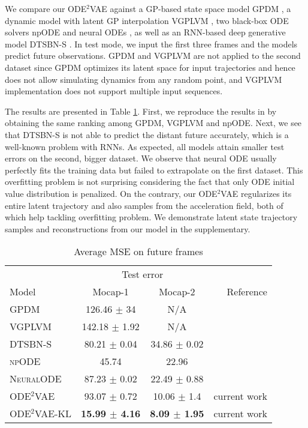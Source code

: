 \documentclass{article}
\newcommand{\0}{\mathbf{0}}
\begin{document}
We compare our ODE$^2$VAE against a GP-based state space model GPDM \citep{wang2008gaussian}, a dynamic model with latent GP interpolation VGPLVM \citep{damianou2011variational}, two black-box ODE solvers npODE \citep{heinonen18a} and neural ODEs \citep{chen2018neural}, as well as an RNN-based deep generative model DTSBN-S \citep{gan2015deep}. In test mode, we input the first three frames and the models predict future observations. GPDM and VGPLVM are not applied to the second dataset since GPDM optimizes its latent space for input trajectories and hence does not allow simulating dynamics from any random point, and VGPLVM implementation does not support multiple input sequences.

The results are presented in Table \ref{tab:cmu}. First, we reproduce the results in \citet{heinonen18a} by obtaining the same ranking among GPDM, VGPLVM and npODE. Next, we see that DTSBN-S is not able to predict the distant future accurately, which is a well-known problem with RNNs. As expected, all models attain smaller test errors on the second, bigger dataset. We observe that neural ODE usually perfectly fits the training data but failed to extrapolate on the first dataset. This overfitting problem is not surprising considering the fact that only ODE initial value distribution is penalized. On the contrary, our ODE$^2$VAE regularizes its entire latent trajectory and also samples from the acceleration field, both of which help tackling overfitting problem. We demonstrate latent state trajectory samples and reconstructions from our model in the supplementary.


\begin{table}[t]
	\caption{Average MSE on future frames}
	\label{tab:cmu}
	\vskip 0.15in
	\begin{center}
    \begin{small}
\begin{tabular}{lccr}
    	\toprule
    	       &  \multicolumn{2}{c}{Test error}   &  \\
    	       \cmidrule{2-3}
		 Model & Mocap-1 & Mocap-2 & Reference \\ 
	    \midrule
		 \textsc{GPDM} & 126.46 $\pm$ 34 & N/A & \cite{wang2008gaussian} \\
		 \textsc{VGPLVM}  & 142.18 $\pm$ 1.92 & N/A & \cite{damianou2011variational} \\
		 \textsc{DTSBN-S}  & 80.21 $\pm$ 0.04 & 34.86 $\pm$ 0.02 & \cite{gan2015deep}\\
		 \textsc{npODE} & 45.74 & 22.96 &  \cite{heinonen18a} \\
		 \textsc{NeuralODE} & 87.23 $\pm$ 0.02 & 22.49 $\pm$ 0.88 & \cite{chen2018neural} \\
		 ODE$^2$VAE & 93.07 $\pm$ 0.72  & 10.06 $\pm$ 1.4 & current work \\
		 ODE$^2$VAE-KL & \textbf{15.99 $\pm$ 4.16} & \textbf{8.09 $\pm$ 1.95} & current work\\
        \bottomrule
    \end{tabular}
\end{small}
    \end{center}
    \vskip -0.1in
\end{table}
\end{document}
